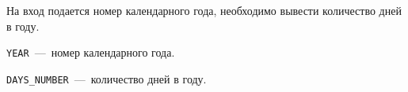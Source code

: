 На вход подается номер календарного года, необходимо вывести количество дней в году.

\InputFile

\texttt{YEAR}~---~номер календарного года.

\OutputFile

\texttt{DAYS\_NUMBER}~---~количество дней в году.

\SAMPLES